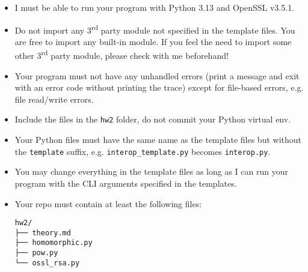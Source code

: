 \documentclass{homework}
\begin{document}
\begin{itemize}
  \item I must be able to run your program with Python 3.13 and OpenSSL v3.5.1\footnotemark{}.
  \item Do not import any 3\textsuperscript{rd} party module\footnotemark{} not specified in the template files.
  You are free to import any built-in module.
  If you feel the need to import some other 3\textsuperscript{rd} party module, please check with me beforehand!
  \item Your program must not have any unhandled errors (print a message and exit with an error code without printing the trace) except for file-based errors, e.g. file read/write errors.
  \item Include the files in the \texttt{hw2} folder, do not commit your Python virtual env.
  \item Your Python files must have the same name as the template files but without the \texttt{template} suffix, e.g. \texttt{interop\_template.py} becomes \texttt{interop.py}.
  \item You may change everything in the template files as long as I can run your program with the CLI arguments specified in the templates.
  \iffalse
  \item \textbf{Check before you submit!}
  You have ways to check whether each of your 3 tasks is functionally correct.
  If
  \begin{enumerate}
    \item I cannot review your homework before the deadline, \emph{and}
    \item your homework does not pass the checks, \emph{and}
    \item you have not stated in your report that this is the case (and what did you try),
  \end{enumerate}
  you \emph{fail} the homework!
  \fi
  \item Your repo must contain at least the following files:
  \begin{Verbatim}
hw2/
├── theory.md
├── homomorphic.py
├── pow.py
└── ossl_rsa.py
  \end{Verbatim}
\begin{Verbatim}
  
\end{Verbatim}
\end{itemize}
\end{document}
